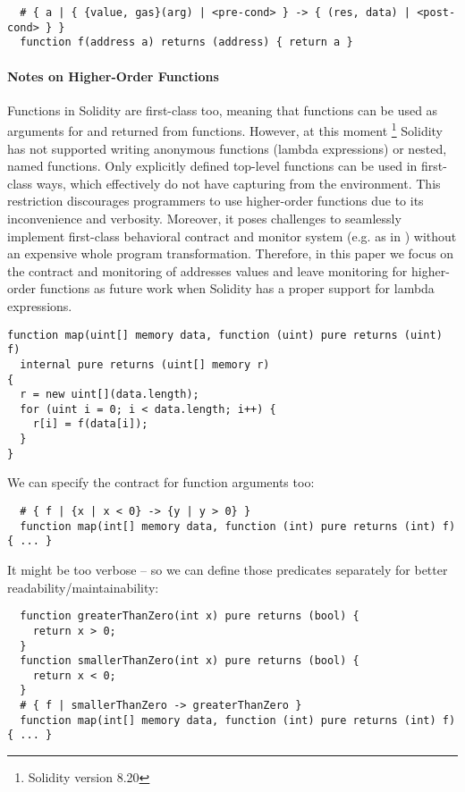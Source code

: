\begin{lstlisting}
  # { a | { {value, gas}(arg) | <pre-cond> } -> { (res, data) | <post-cond> } }
  function f(address a) returns (address) { return a }
\end{lstlisting}

\paragraph{Notes on Higher-Order Functions}
Functions in Solidity are first-class too, meaning that functions can be used
as arguments for and returned from functions. However, at this moment
\footnote{Solidity version 8.20} Solidity has not supported writing anonymous
functions (lambda expressions) or nested, named functions.
Only explicitly defined top-level functions can be used in first-class ways,
which effectively do not have capturing from the environment.
This restriction discourages programmers to use higher-order functions due to
its inconvenience and verbosity.
Moreover, it poses challenges to seamlessly implement first-class behavioral
contract and monitor system (e.g. as in \cite{DBLP:conf/icfp/FindlerF02})
without an expensive whole program transformation.
Therefore, in this paper we focus on the contract and monitoring of addresses
values and leave monitoring for higher-order functions as future work when
Solidity has a proper support for lambda expressions.

\iffalse
	\begin{lstlisting}
function map(uint[] memory data, function (uint) pure returns (uint) f)
  internal pure returns (uint[] memory r)
{
  r = new uint[](data.length);
  for (uint i = 0; i < data.length; i++) {
    r[i] = f(data[i]);
  }
}
\end{lstlisting}

We can specify the contract for function arguments too:
\begin{lstlisting}
  # { f | {x | x < 0} -> {y | y > 0} }
  function map(int[] memory data, function (int) pure returns (int) f) { ... }
\end{lstlisting}
It might be too verbose -- so we can define those predicates separately for better readability/maintainability:
\begin{lstlisting}
  function greaterThanZero(int x) pure returns (bool) {
    return x > 0;
  }
  function smallerThanZero(int x) pure returns (bool) {
    return x < 0;
  }
  # { f | smallerThanZero -> greaterThanZero }
  function map(int[] memory data, function (int) pure returns (int) f) { ... }
\end{lstlisting}

